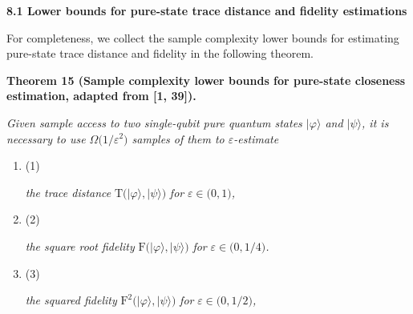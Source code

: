 \documentclass[10pt,a4paper]{article}
\begin{document}
\par\medskip\noindent\textbf{
8.1 Lower bounds for pure-state trace distance and fidelity estimations}\par




For completeness, we collect the sample complexity lower bounds for estimating pure-state trace distance and fidelity in the following theorem.\par





\par\medskip\noindent\textbf{
\textbf{Theorem 15}\textbf{ }(Sample complexity lower bounds for pure-state closeness estimation, adapted from [1, 39])\textbf{.}
}\par



\emph{Given sample access to two single-qubit pure quantum states $\lvert\varphi\rangle$ and $\lvert\psi\rangle$, it is necessary to use $\Omega\lparen 1/\varepsilon^{2}\rparen$ samples of them to $\varepsilon$-estimate}\par


\begin{enumerate}


\item[] 
(1) 


\emph{the trace distance }$\mathrm{T}\lparen\lvert\varphi\rangle,\lvert\psi\rangle\rparen$\emph{ for }$\varepsilon\in\lparen 0,1\rparen$\emph{,}\par





\item[] 
(2) 


\emph{the square root fidelity }$\mathrm{F}\lparen\lvert\varphi\rangle,\lvert\psi\rangle\rparen$\emph{ for }$\varepsilon\in\lparen 0,1/4\rparen$\emph{.}\par





\item[] 
(3) 


\emph{the squared fidelity }$\mathrm{F}^{2}\lparen\lvert\varphi\rangle,\lvert\psi\rangle\rparen$\emph{ for }$\varepsilon\in\lparen 0,1/2\rparen$\emph{,}\par





\end{enumerate}
\end{document}

